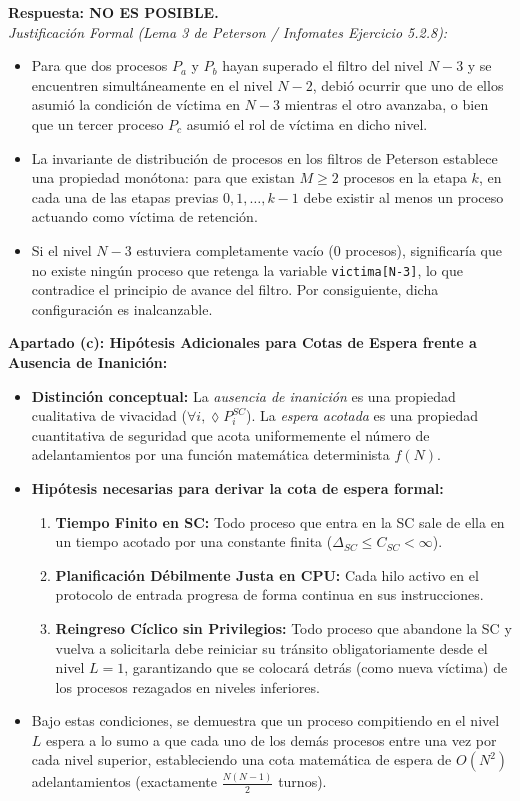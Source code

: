 \documentclass[11pt,a4paper,twoside,openright]{report}
\begin{document}
\begin{solucion}
\textbf{Respuesta: NO ES POSIBLE.}\\
\emph{Justificación Formal (Lema 3 de Peterson / Infomates Ejercicio 5.2.8):}
\begin{itemize}[leftmargin=*]
    \item Para que dos procesos $P_a$ y $P_b$ hayan superado el filtro del nivel $N-3$ y se encuentren simultáneamente en el nivel $N-2$, debió ocurrir que uno de ellos asumió la condición de víctima en $N-3$ mientras el otro avanzaba, o bien que un tercer proceso $P_c$ asumió el rol de víctima en dicho nivel.
    \item La invariante de distribución de procesos en los filtros de Peterson establece una propiedad monótona: para que existan $M \ge 2$ procesos en la etapa $k$, en cada una de las etapas previas $0, 1, \dots, k-1$ debe existir al menos un proceso actuando como víctima de retención.
    \item Si el nivel $N-3$ estuviera completamente vacío (0 procesos), significaría que no existe ningún proceso que retenga la variable \texttt{victima[N-3]}, lo que contradice el principio de avance del filtro. Por consiguiente, dicha configuración es inalcanzable.
\end{itemize}

\textbf{Apartado (c): Hipótesis Adicionales para Cotas de Espera frente a Ausencia de Inanición:}\\
\begin{itemize}[leftmargin=*]
    \item \textbf{Distinción conceptual:} La \emph{ausencia de inanición} es una propiedad cualitativa de vivacidad ($\forall i, \lozenge P_i^{SC}$). La \emph{espera acotada} es una propiedad cuantitativa de seguridad que acota uniformemente el número de adelantamientos por una función matemática determinista $f(N)$.
    \item \textbf{Hipótesis necesarias para derivar la cota de espera formal:}
    \begin{enumerate}[leftmargin=*]
        \item \textbf{Tiempo Finito en SC:} Todo proceso que entra en la SC sale de ella en un tiempo acotado por una constante finita ($\Delta_{SC} \le C_{SC} < \infty$).
        \item \textbf{Planificación Débilmente Justa en CPU:} Cada hilo activo en el protocolo de entrada progresa de forma continua en sus instrucciones.
        \item \textbf{Reingreso Cíclico sin Privilegios:} Todo proceso que abandone la SC y vuelva a solicitarla debe reiniciar su tránsito obligatoriamente desde el nivel $L=1$, garantizando que se colocará detrás (como nueva víctima) de los procesos rezagados en niveles inferiores.
    \end{enumerate}
    \item Bajo estas condiciones, se demuestra que un proceso compitiendo en el nivel $L$ espera a lo sumo a que cada uno de los demás procesos entre una vez por cada nivel superior, estableciendo una cota matemática de espera de $O(N^2)$ adelantamientos (exactamente $\frac{N(N-1)}{2}$ turnos).
\end{itemize}
\end{solucion}
\end{document}
